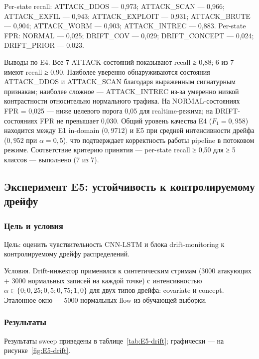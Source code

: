 Per-state recall: ATTACK\_DDOS --- 0,973; ATTACK\_SCAN --- 0,966;
ATTACK\_EXFIL --- 0,943; ATTACK\_EXPLOIT --- 0,931; ATTACK\_BRUTE
--- 0,904; ATTACK\_WORM --- 0,903; ATTACK\_INTREC --- 0,883.
Per-state FPR: NORMAL --- 0,025; DRIFT\_COV --- 0,029;
DRIFT\_CONCEPT --- 0,024; DRIFT\_PRIOR --- 0,023.

Выводы по E4. Все 7 ATTACK-состояний показывают recall ≥ 0,88;
6 из 7 имеют recall ≥ 0,90. Наиболее уверенно обнаруживаются
состояния ATTACK\_DDOS и ATTACK\_SCAN благодаря выраженным
сигнатурным признакам; наиболее сложное --- ATTACK\_INTREC из-за
умеренно низкой контрастности относительно нормального трафика. На
NORMAL-состояниях FPR = 0,025 --- ниже целевого порога 0,05 для
realtime-режима; на DRIFT-состояниях FPR не превышает 0,030.
Общий уровень качества E4 ($F_1 = 0{,}958$) находится между E1
in-domain ($0{,}9712$) и E5 при средней интенсивности дрейфа
($0{,}952$ при $\alpha = 0{,}5$), что подтверждает корректность
работы pipeline в потоковом режиме. Соответствие критерию принятия
--- per-state recall ≥ 0,50 для ≥ 5 классов --- выполнено (7 из 7).

\subsection{Эксперимент E5: устойчивость к контролируемому дрейфу}
\label{subsec:E5}

\subsubsection{Цель и условия}

Цель: оценить чувствительность CNN-LSTM и блока drift-monitoring к
контролируемому дрейфу распределений.

Условия. Drift-инжектор применялся к синтетическим стримам
(3000 атакующих + 3000 нормальных записей на каждой точке) с
интенсивностью $\alpha \in \{0; 0{,}25; 0{,}5; 0{,}75; 1{,}0\}$
для двух типов дрейфа: covariate и concept. Эталонное окно ---
5000 нормальных flow из обучающей выборки.

\subsubsection{Результаты}

Результаты sweep приведены в таблице~\ref{tab:E5-drift};
графически --- на рисунке~\ref{fig:E5-drift}.

